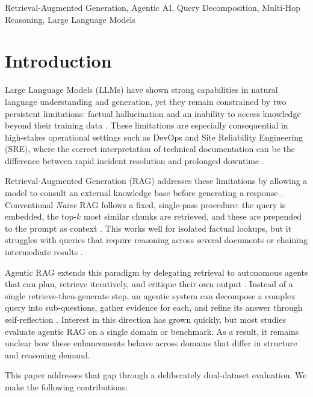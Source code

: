 \documentclass[conference]{IEEEtran}
\begin{document}
\begin{IEEEkeywords}
Retrieval-Augmented Generation, Agentic AI, Query Decomposition, Multi-Hop Reasoning, Large Language Models
\end{IEEEkeywords}

\section{Introduction}
Large Language Models (LLMs) have shown strong capabilities in natural language understanding and generation, yet they remain constrained by two persistent limitations: factual hallucination and an inability to access knowledge beyond their training data \cite{ji2023hallucination, mialon2023augmented}. These limitations are especially consequential in high-stakes operational settings such as DevOps and Site Reliability Engineering (SRE), where the correct interpretation of technical documentation can be the difference between rapid incident resolution and prolonged downtime \cite{amazon2024chatops}.

Retrieval-Augmented Generation (RAG) addresses these limitations by allowing a model to consult an external knowledge base before generating a response \cite{lewis2020rag, guu2020realm}. Conventional \emph{Naive} RAG follows a fixed, single-pass procedure: the query is embedded, the top-$k$ most similar chunks are retrieved, and these are prepended to the prompt as context \cite{amorim2024empirical}. This works well for isolated factual lookups, but it struggles with queries that require reasoning across several documents or chaining intermediate results \cite{feldman2023multihop, gao2023survey}.

Agentic RAG extends this paradigm by delegating retrieval to autonomous agents that can plan, retrieve iteratively, and critique their own output \cite{ghadekar2025survey, wang2024evolution}. Instead of a single retrieve-then-generate step, an agentic system can decompose a complex query into sub-questions, gather evidence for each, and refine its answer through self-reflection \cite{asai2024selfrag, yao2022react}. Interest in this direction has grown quickly, but most studies evaluate agentic RAG on a single domain or benchmark. As a result, it remains unclear how these enhancements behave across domains that differ in structure and reasoning demand.

This paper addresses that gap through a deliberately dual-dataset evaluation. We make the following contributions:
\end{document}
